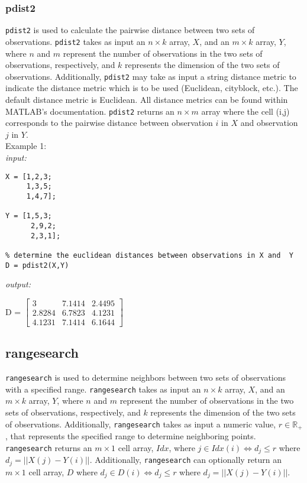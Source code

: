\documentclass[../MATLAB_Primer.tex]{subfiles}
\begin{document}
\subsubsection{pdist2}
\texttt{pdist2} is used to calculate the pairwise distance between two sets of observations. \texttt{pdist2} takes as input an $n\times k$ array, $X$, and an $m\times k$ array, $Y$, where $n$ and $m$ represent the number of observations in the two sets of observations, respectively, and $k$ represents the dimension of the two sets of observations. Additionally, \texttt{pdist2} may take as input a string distance metric to indicate the distance metric which is to be used (Euclidean, cityblock, etc.). The default distance metric is Euclidean. All distance metrics can be found within MATLAB's documentation. \texttt{pdist2} returns an $n\times m$ array where the cell (i,j) corresponds to the pairwise distance between observation $i$ in $X$ and observation $j$ in $Y$.\\

Example 1:\\

\textit{input:}
\begin{lstlisting}[frame=single]
% consider two sets of observations X & Y (sets of agent positions in 3-D)
X = [1,2,3;
     1,3,5;
     1,4,7];
     
Y = [1,5,3;
      2,9,2;
      2,3,1];

% determine the euclidean distances between observations in X and  Y
D = pdist2(X,Y) 
\end{lstlisting}

\textit{output:}

\begin{center}
    D = 
    $\begin{bmatrix}
    3 & 7.1414 & 2.4495\\ 
    2.8284 & 6.7823 & 4.1231\\
    4.1231 & 7.1414 & 6.1644
    \end{bmatrix}$
\end{center}

\subsection{rangesearch}
\texttt{rangesearch}  is used to determine neighbors between two sets of observations with a specified range. \texttt{rangesearch} takes as input an $n\times k$ array, $X$, and an $m\times k$ array, $Y$, where $n$ and $m$ represent the number of observations in the two sets of observations, respectively, and $k$ represents the dimension of the two sets of observations. Additionally, \texttt{rangesearch} takes as input a numeric value, $r\in \mathbb{R}_+$, that represents the specified range to determine neighboring points. \texttt{rangesearch} returns an $m\times 1$ cell array, $Idx$, where $j\in Idx(i)\Leftrightarrow d_j\leq r$ where $d_j = ||X(j)-Y(i)||$. Additionally, \texttt{rangesearch} can optionally return an $m\times 1$ cell array, $D$ where $d_j\in D(i) \Leftrightarrow d_j\leq r$ where $d_j = ||X(j)-Y(i)||$.\\
\end{document}
